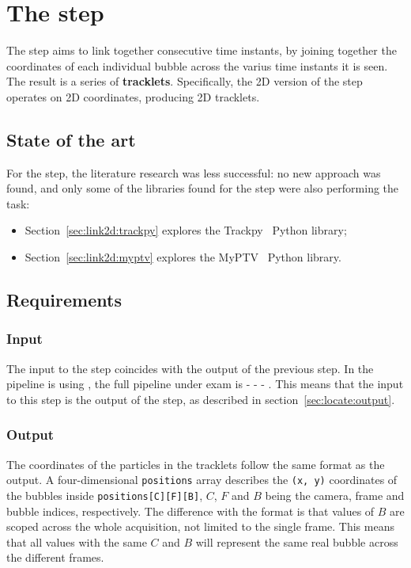 \chapter{The \linkDD* step}
\label{chap:2dlink}

The \link* step aims to link together consecutive time instants, by joining together the coordinates of each individual bubble across the varius time instants it is seen.
The result is a series of \textbf{tracklets}.
Specifically, the 2D version of the \link* step operates on 2D coordinates, producing 2D tracklets.

\section{State of the art}

For the \link* step, the literature research was less successful: no new approach was found, and only some of the libraries found for the \locate* step were also performing the task:
\begin{itemize}
	\itemsep 0em
	\item Section~\ref{sec:link2d:trackpy} explores the Trackpy~\cite{trackpy} Python library;
	\item Section~\ref{sec:link2d:myptv} explores the MyPTV~\cite{myptv} Python library.
\end{itemize}

\section{Requirements}

\subsection{Input}

The input to the \link* step coincides with the output of the previous step.
In the pipeline is using \linkDD*, the full pipeline under exam is \locate* - \link* - \match* - \visual*.
This means that the input to this step is the output of the \locate* step, as described in section~\ref{sec:locate:output}.

\subsection{Output}

The coordinates of the particles in the tracklets follow the same format as the \locate* output.
A four-dimensional \texttt{positions} array describes the \texttt{(x, y)} coordinates of the bubbles inside \texttt{positions[C][F][B]}, $C$, $F$ and $B$ being the camera, frame and bubble indices, respectively.
The difference with the \locate* format is that values of $B$ are scoped across the whole acquisition, not limited to the single frame.
This means that all values with the same $C$ and $B$ will represent the same real bubble across the different frames.

